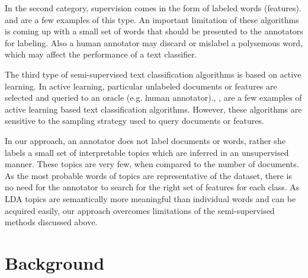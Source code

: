 \documentclass[11pt]{article}
\begin{document}
In the second category, supervision comes in the form of labeled words (features). \cite{Liu:2004:Text} and \cite{Druck:2008:LLF:1390334.1390436} are a few examples of this type. An important limitation of these algorithms is coming up with a small set of words that should be presented to the annotators for labeling. Also a human annotator may discard or mislabel a polysemous word, which may affect the performance of a text classifier.

The third type of semi-supervised text classification algorithms is based on active learning. In active learning, particular unlabeled documents or features are selected and queried to an oracle (e.g. human annotator).\cite{DBLP:conf/pkdd/GodboleHSC04}, \cite{Raghavan:2006:ALF:1248547.1248608}, \cite{DBLP:conf/emnlp/DruckSM09} are a few examples of active learning based text classification algorithms. However, these algorithms are sensitive to the sampling strategy used to query documents or features.

In our approach, an annotator does not label documents or words, rather she labels a small set of interpretable topics which are inferred in an unsupervised manner. These topics are very few, when compared to the number of documents. As the most probable words of topics are representative of the dataset, there is no need for the annotator to search for the right set of features for each class. As LDA topics are semantically more meaningful than individual words and can be acquired easily, our approach overcomes limitations of the semi-supervised methods discussed above.
\section{Background}\label{sec:DC}
\end{document}
